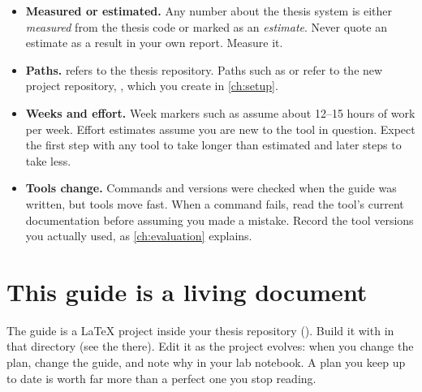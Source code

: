 \begin{itemize}
  \item \textbf{Measured or estimated.} Any number about the thesis system is
        either \emph{measured} from the thesis code or marked as an
        \emph{estimate}. Never quote an estimate as a result in your own report.
        Measure it.
  \item \textbf{Paths.}  refers to the thesis repository.
        Paths such as  or 
        refer to the new project repository, , which you
        create in \cref{ch:setup}.
  \item \textbf{Weeks and effort.} Week markers such as  assume about
        12--15 hours of work per week. Effort estimates assume you are new to
        the tool in question. Expect the first step with any tool to take longer
        than estimated and later steps to take less.
  \item \textbf{Tools change.} Commands and versions were checked when the guide
        was written, but tools move fast. When a command fails, read the tool's
        current documentation before assuming you made a mistake. Record the tool
        versions you actually used, as \cref{ch:evaluation} explains.
\end{itemize}

\section*{This guide is a living document}

The guide is a LaTeX project inside your thesis repository
(). Build it with  in that directory (see
the  there). Edit it as the project evolves: when you change the
plan, change the guide, and note why in your lab notebook. A plan you keep up to
date is worth far more than a perfect one you stop reading.
